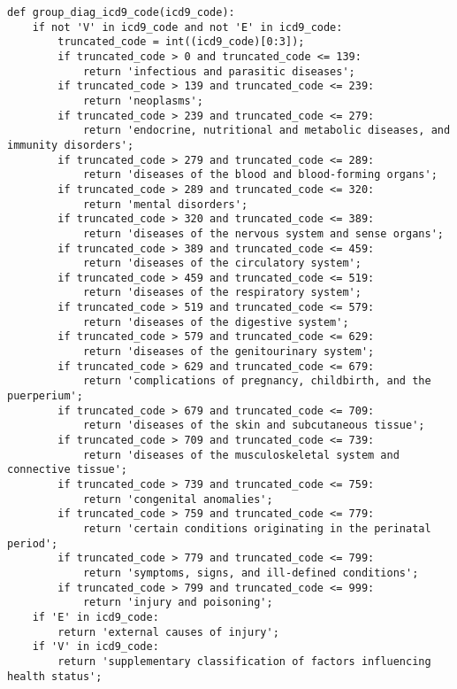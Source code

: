 \documentclass{report}
\begin{document}
\begin{verbatim}
def group_diag_icd9_code(icd9_code):
    if not 'V' in icd9_code and not 'E' in icd9_code:
        truncated_code = int((icd9_code)[0:3]);
        if truncated_code > 0 and truncated_code <= 139:
            return 'infectious and parasitic diseases';
        if truncated_code > 139 and truncated_code <= 239:
            return 'neoplasms';
        if truncated_code > 239 and truncated_code <= 279:
            return 'endocrine, nutritional and metabolic diseases, and immunity disorders';
        if truncated_code > 279 and truncated_code <= 289:
            return 'diseases of the blood and blood-forming organs';
        if truncated_code > 289 and truncated_code <= 320:
            return 'mental disorders';
        if truncated_code > 320 and truncated_code <= 389:
            return 'diseases of the nervous system and sense organs';
        if truncated_code > 389 and truncated_code <= 459:
            return 'diseases of the circulatory system';
        if truncated_code > 459 and truncated_code <= 519:
            return 'diseases of the respiratory system';
        if truncated_code > 519 and truncated_code <= 579:
            return 'diseases of the digestive system';
        if truncated_code > 579 and truncated_code <= 629:
            return 'diseases of the genitourinary system';
        if truncated_code > 629 and truncated_code <= 679:
            return 'complications of pregnancy, childbirth, and the puerperium';
        if truncated_code > 679 and truncated_code <= 709:
            return 'diseases of the skin and subcutaneous tissue';
        if truncated_code > 709 and truncated_code <= 739:
            return 'diseases of the musculoskeletal system and connective tissue';
        if truncated_code > 739 and truncated_code <= 759:
            return 'congenital anomalies';
        if truncated_code > 759 and truncated_code <= 779:
            return 'certain conditions originating in the perinatal period';        
        if truncated_code > 779 and truncated_code <= 799:
            return 'symptoms, signs, and ill-defined conditions';       
        if truncated_code > 799 and truncated_code <= 999:
            return 'injury and poisoning';                         
    if 'E' in icd9_code: 
        return 'external causes of injury';
    if 'V' in icd9_code: 
        return 'supplementary classification of factors influencing health status';    
\end{verbatim}
\end{document}
